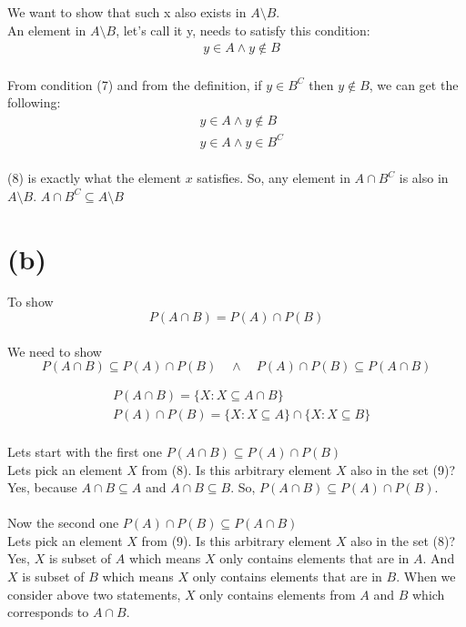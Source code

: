 \documentclass{article}
\begin{document}
We want to show that such x also exists
in $A \setminus B$. \\
An element in $A \setminus B$, let's call it y,  needs to satisfy this condition:
\begin{align}
    & y \in A \land y \notin B
\end{align}
\\
From condition (7) and from the definition, if $y \in B^C$ then $y \notin B$, we can get the following:
\begin{align}
   & y \in A \land y \notin B \tag*{(7)} \\
   & y \in A \land y \in B^C \tag*{(8)}
\end{align}
\\
(8) is exactly what the element $x$ satisfies. So, any element in $A \cap B^C$ is also in $A \setminus B$. $A \cap B^C \subseteq A \setminus B$
\\

\section*{(b)}
To show
\[
   P(A \cap B) = P(A) \cap P(B)
\]
\\
We need to show
\[
   P(A \cap B) \subseteq P(A) \cap P(B) \quad \land \quad P(A) \cap P(B) \subseteq P(A \cap B)
\]

\begin{align}
    & P(A \cap B)    = \{X: X \subseteq A \cap B\}                  \\
    & P(A) \cap P(B) = \{X: X \subseteq A\} \cap \{X: X \subseteq B\}
\end{align}
\\
Lets start with the first one $P(A \cap B) \subseteq P(A) \cap P(B)$
\\
Lets pick an element $X$ from (8). Is this arbitrary element $X$ also in the set (9)? \\
Yes, because $A \cap B \subseteq A$ and $A \cap B \subseteq B$. So, $P(A \cap B) \subseteq P(A) \cap P(B)$.
\\
\\
Now the second one $P(A) \cap P(B) \subseteq P(A \cap B)$ \\
Lets pick an element $X$ from (9). Is this arbitrary element $X$ also in the set (8)? \\
Yes, $X$ is subset of $A$ which means $X$ only contains elements that are in $A$.
And $X$ is subset of $B$ which means $X$ only contains elements that are in $B$.
When we consider above two statements, $X$ only contains elements from $A$ and $B$ which corresponds to $A \cap B$.
\end{document}
